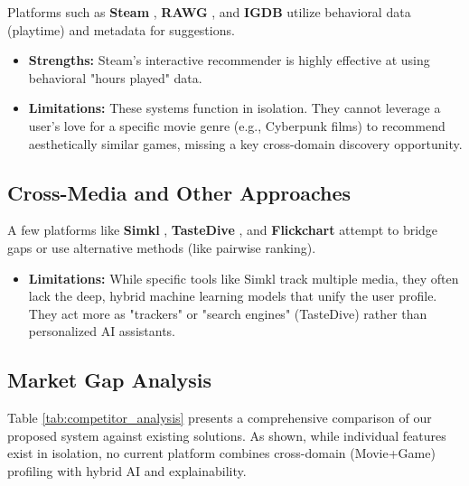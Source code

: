 Platforms such as \textbf{Steam} \cite{steam_site}, \textbf{RAWG} \cite{rawg_site}, and \textbf{IGDB} \cite{igdb_ref} utilize behavioral data (playtime) and metadata for suggestions.

\begin{itemize}

    \item \textbf{Strengths:} Steam's interactive recommender is highly effective at using behavioral "hours played" data.

    \item \textbf{Limitations:} These systems function in isolation. They cannot leverage a user's love for a specific movie genre (e.g., Cyberpunk films) to recommend aesthetically similar games, missing a key cross-domain discovery opportunity.

\end{itemize}



\subsection{Cross-Media and Other Approaches}

A few platforms like \textbf{Simkl} \cite{simkl_site}, \textbf{TasteDive} \cite{tastedive_site}, and \textbf{Flickchart} \cite{flickchart_site} attempt to bridge gaps or use alternative methods (like pairwise ranking).

\begin{itemize}

    \item \textbf{Limitations:} While specific tools like Simkl track multiple media, they often lack the deep, hybrid machine learning models that unify the user profile. They act more as "trackers" or "search engines" (TasteDive) rather than personalized AI assistants.

\end{itemize}



\subsection{Market Gap Analysis}

Table \ref{tab:competitor_analysis} presents a comprehensive comparison of our proposed system against existing solutions. As shown, while individual features exist in isolation, no current platform combines cross-domain (Movie+Game) profiling with hybrid AI and explainability.



